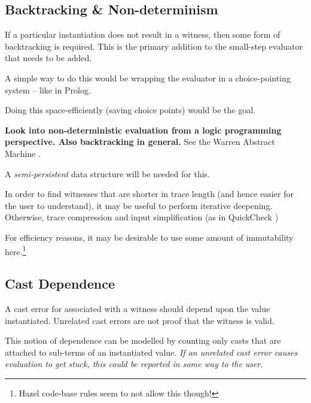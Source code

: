 \subsection{Backtracking \& Non-determinism}
If a particular instantiation does not result in a witness, then some form of backtracking is required. This is the primary addition to the small-step evaluator that needs to be added.\par 
A simple way to do this would be wrapping the evaluator in a choice-pointing system -- like in Prolog. \par 
Doing this space-efficiently (saving choice points) would be the goal.\par 
\textbf{Look into non-deterministic evaluation from a logic programming perspective. Also backtracking in general.} See the Warren Abstract Machine \cite{WAM}.\par 
A \textit{semi-persistent} data structure \cite{SemiPersistent} will be needed for this.\par 
In order to find witnesses that are shorter in trace length (and hence easier for the user to understand), it may be useful to perform iterative deepening. Otherwise, trace compression and input simplification (as in QuickCheck \cite{QuickCheck})
\par 
For efficiency reasons, it may be desirable to use some amount of immutability here.\footnote{Hazel code-base rules seem to not allow this though!}

\subsection{Cast Dependence}
A cast error for associated with a witness should depend upon the value instantiated. Unrelated cast errors are not proof that the witness is valid.\par 
This notion of dependence can be modelled by counting only casts that are attached to sub-terms of an instantiated value. \textit{If an unrelated cast error causes evaluation to get stuck, this could be reported in some way to the user.}\par 

